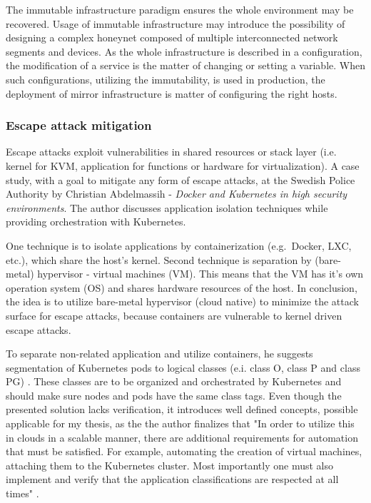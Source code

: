 \documentclass[12pt,a4paper,twoside]{report}
\begin{document}
The immutable infrastructure paradigm ensures the whole environment may be recovered. Usage of immutable infrastructure may introduce the possibility of designing a complex honeynet composed of multiple interconnected network segments and devices. As the whole infrastructure is described in a configuration, the modification of a service is the matter of changing or setting a variable. When such configurations, utilizing the immutability, is used in production, the deployment of mirror infrastructure is matter of configuring the right hosts.


\subsubsection{Escape attack mitigation}\label{escape-attack-mitigation}
Escape attacks exploit vulnerabilities in shared resources or stack layer (i.e. kernel for KVM, application for functions or hardware for virtualization). A case study, with a goal to mitigate any form of escape attacks, at the Swedish Police Authority by Christian Abdelmassih - \emph{Docker and Kubernetes in high security environments}. The author discusses application isolation techniques while providing orchestration with Kubernetes.

One technique is to isolate applications by containerization (e.g.~Docker, LXC, etc.), which share the host's kernel. Second technique is separation by (bare-metal) hypervisor - virtual machines (VM). This means that the VM has it's own operation system (OS) and shares hardware resources of the host. In conclusion, the idea is to
utilize bare-metal hypervisor (cloud native) to minimize the attack surface for escape attacks, because containers are vulnerable to kernel driven escape attacks.


To separate non-related application and utilize containers, he suggests segmentation of Kubernetes pods to logical classes (e.i. class O, class P and class PG) \cite{research:thesis:docker-k8s-security}. These classes are to be organized and orchestrated by Kubernetes and should make sure nodes and pods have the same class tags. Even though the presented solution lacks verification, it introduces well defined concepts, possible applicable for my thesis, as the the author finalizes that "In order to utilize this in clouds in a scalable manner, there are additional requirements for automation that must be satisfied. For example, automating the creation of virtual machines, attaching them to the Kubernetes cluster. Most importantly one must also implement and verify that the application classifications are respected at all times" \cite{research:blog:docker-k8s-security}.
\end{document}
